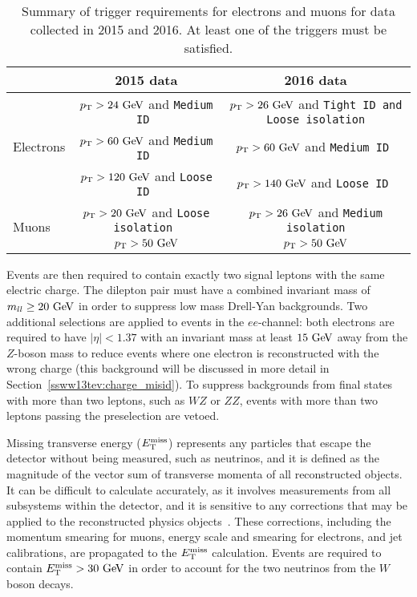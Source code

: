 \begin{table}[htbp]
  \centering
  \begin{tabular}{l | c | c}
    & 2015 data & 2016 data \\
    \hline\hline
    \multirow{3}{*}{Electrons} & $\pt > 24\gev$ and \tt{Medium} ID & $\pt > 26\gev$ and \tt{Tight} ID and \tt{Loose} isolation\\
                               & $\pt > 60\gev$ and \tt{Medium} ID & $\pt > 60\gev$ and \tt{Medium} ID \\
                               & $\pt > 120\gev$ and \tt{Loose} ID & $\pt > 140\gev$ and \tt{Loose} ID \\
    \hline
    \multirow{2}{*}{Muons}     & $\pt > 20\gev$ and \tt{Loose} isolation & $\pt > 26\gev$ and \tt{Medium} isolation\\
                               & $\pt > 50\gev$ & $\pt > 50\gev$ \\
    \hline
  \end{tabular}
  \caption{Summary of trigger requirements for electrons and muons for  data collected in 2015 and 2016.  At least one of the triggers must be satisfied.}
  \label{tab:ssww13tev_triggers}
\end{table}

Events are then required to contain exactly two signal leptons with the same electric charge.
The dilepton pair must have a combined invariant mass of $m_{ll} \ge 20\gev$ in order to suppress low mass Drell-Yan backgrounds.
Two additional selections are applied to events in the $ee$-channel: both electrons are required to have $|\eta| < 1.37$ with an invariant mass at least $15\gev$ away from the $Z$-boson mass to reduce events where one electron is reconstructed with the wrong charge (this background will be discussed in more detail in Section~\ref{ssww13tev:charge_misid}).
To suppress backgrounds from final states with more than two leptons, such as $WZ$ or $ZZ$, events with more than two leptons passing the preselection are vetoed.

Missing transverse energy ($E_{\mathrm{T}}^{\mathrm{miss}}$) represents any particles that escape the detector without being measured, such as neutrinos, and it is defined as the magnitude of the vector sum of transverse momenta of all reconstructed objects.
It can be difficult to calculate accurately, as it involves measurements from all subsystems within the detector, and it is sensitive to any corrections that may be applied to the reconstructed physics objects~\cite{2018.met-13tev}.
These corrections, including the momentum smearing for muons, energy scale and smearing for electrons, and jet calibrations, are propagated to the $E_{\mathrm{T}}^{\mathrm{miss}}$ calculation.
Events are required to contain $\met > 30\gev$ in order to account for the two neutrinos from the $W$ boson decays.

